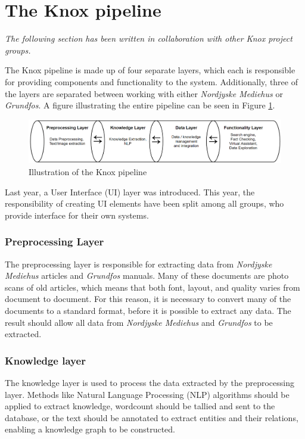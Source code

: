 \section{The Knox pipeline}\label{the_knox_pipeline}
\textit{The following section has been written in collaboration with other Knox project groups.}


The Knox pipeline is made up of four separate layers, which each is responsible for providing components and functionality to the system.
 Additionally, three of the layers are separated between working with either \textit{Nordjyske Mediehus} or \textit{Grundfos}.
  A figure illustrating the entire pipeline can be seen in Figure \ref{fig:pipeline}.

\begin{figure}[h]
    \centering
    \includegraphics[width=1\textwidth]{Images/Pipeline.PNG}
    \caption{Illustration of the Knox pipeline\label{fig:pipeline}}
\end{figure}

Last year, a User Interface (UI) layer was introduced. This year, the responsibility of creating UI elements have been split among all groups, who provide interface for their own systems.

\subsubsection{Preprocessing Layer}
The preprocessing layer is responsible for extracting data from \textit{Nordjyske Mediehus} articles and \textit{Grundfos} manuals. Many of these documents are photo scans of old articles, which means that both font, layout, and quality varies from document to document. For this reason, it is necessary to convert many of the documents to a standard format, before it is possible to extract any data. The result should allow all data from \textit{Nordjyske Mediehus} and \textit{Grundfos} to be extracted. 

\subsubsection{Knowledge layer}
The knowledge layer is used to process the data extracted by the preprocessing layer. Methods like Natural Language Processing (NLP) algorithms should be applied to extract knowledge, wordcount should be tallied and sent to the database, or the text should be annotated to extract entities and their relations, enabling a knowledge graph to be constructed.

